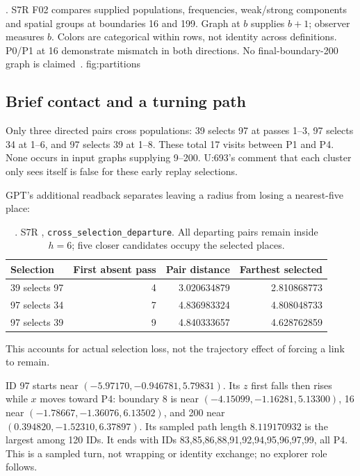 {. S7R F02 compares supplied populations, frequencies, weak/strong components and spatial groups at boundaries 16 and 199. Graph at \(b\) supplies \(b+1\); observer measures \(b\). Colors are categorical within rows, not identity across definitions. P0/P1 at 16 demonstrate mismatch in both directions. No final-boundary-200 graph is claimed~\citep{s7rreview}.}
{fig:partitions}

\subsection{Brief contact and a turning path}
Only three directed pairs cross populations: 39 selects 97 at passes 1--3, 97 selects 34 at 1--6, and 97 selects 39 at 1--8. These total 17 visits between P1 and P4. None occurs in input graphs supplying 9--200. U:693's comment that each cluster only sees itself is false for these early replay selections.

GPT's additional readback separates leaving a radius from losing a nearest-five place:
\begin{table}[H]\centering\small
\begin{tabular}{lrrr}\toprule
Selection & First absent pass & Pair distance & Farthest selected\\\midrule
39 selects 97 & 4 & 3.020634879 & 2.810868773\\
97 selects 34 & 7 & 4.836983324 & 4.808048733\\
97 selects 39 & 9 & 4.840333657 & 4.628762859\\
\bottomrule\end{tabular}
\caption{. S7R \protect{}, \texttt{cross\_selection\_departure}. All departing pairs remain inside \(h=6\); five closer candidates occupy the selected places.}\label{tab:depart}
\end{table}
This accounts for actual selection loss, not the trajectory effect of forcing a link to remain.

ID 97 starts near \((-5.97170,-0.946781,5.79831)\). Its \(z\) first falls then rises while \(x\) moves toward P4: boundary 8 is near \((-4.15099,-1.16281,5.13300)\), 16 near \((-1.78667,-1.36076,6.13502)\), and 200 near \((0.394820,-1.52310,6.37897)\). Its sampled path length \(8.119170932\) is the largest among 120 IDs. It ends with IDs 83,85,86,88,91,92,94,95,96,97,99, all P4. This is a sampled turn, not wrapping or identity exchange; no explorer role follows.

